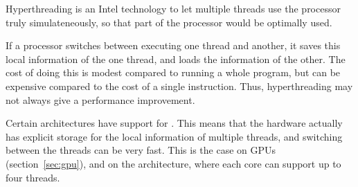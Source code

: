 Hyperthreading is an Intel technology to let multiple threads use the
processor truly simulateneously, so that part of the processor would
be optimally used.

If a processor switches between executing one thread and another, it saves this
local information of the one thread, and loads the information of the other.
The cost of doing this is modest compared to running a whole program, but 
can be expensive compared to the cost of a single instruction. Thus,
hyperthreading may not always give a performance improvement.

Certain architectures have support
for . This means that the hardware actually
has explicit storage for the local information of multiple threads,
and switching between the threads can be very fast. This is the case
on \acp{GPU} (section~\ref{sec:gpu}), and on
the  architecture, where each core can
support up to four threads.



